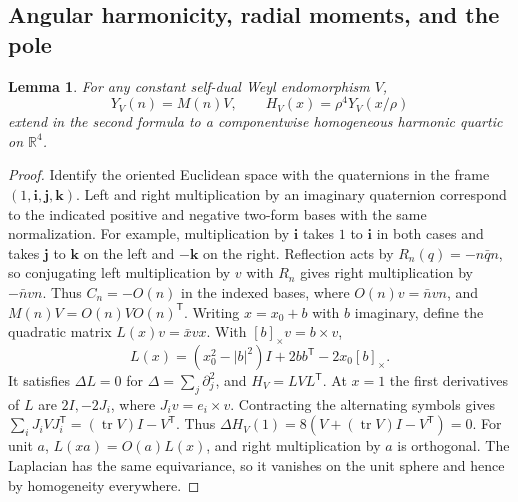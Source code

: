 \documentclass[11pt]{article}
\numberwithin{equation}{section}
\newtheorem{lemma}[theorem]{Lemma}
\theoremstyle{definition}
\theoremstyle{remark}
\begin{document}
\subsection{Angular harmonicity, radial moments, and the pole}

\begin{lemma}\label{xfer:harmonic}
For any constant self-dual Weyl endomorphism \(V\),
\[
 Y_V(n)=M(n)V,\qquad H_V(x)=\rho^4Y_V(x/\rho)
\]
extend in the second formula to a componentwise homogeneous
harmonic quartic on \(\mathbb R^4\).
\end{lemma}

\begin{proof}
Identify the oriented Euclidean space with the quaternions in
the frame \((1,\mathbf i,\mathbf j,\mathbf k)\).
Left and right multiplication by an imaginary quaternion correspond
to the indicated positive and negative two-form bases with the same
normalization. For example, multiplication by \(\mathbf i\) takes
\(1\) to \(\mathbf i\) in both cases and takes \(\mathbf j\)
to \(\mathbf k\) on the left and \(-\mathbf k\) on the right.
Reflection acts by \(R_n(q)=-n\bar qn\), so conjugating
left multiplication by \(v\) with \(R_n\) gives right multiplication
by \(-\bar nvn\). Thus \(C_n=-O(n)\) in the indexed bases, where
\(O(n)v=\bar nvn\), and \(M(n)V=O(n)VO(n)^{\mathsf T}\).
Writing \(x=x_0+b\) with \(b\) imaginary, define the quadratic
matrix \(L(x)v=\bar xvx\). With \([b]_\times v=b\times v\),
\[
 L(x)=(x_0^2-|b|^2)I+2bb^{\mathsf T}-2x_0[b]_\times.
\]
It satisfies \(\Delta L=0\) for \(\Delta=\sum_j\partial_j^2\),
and \(H_V=L V L^{\mathsf T}\).
At \(x=1\) the first derivatives of \(L\) are \(2I,-2J_i\),
where \(J_i v=e_i\times v\). Contracting the alternating symbols
gives \(\sum_i J_i VJ_i^{\mathsf T}=(\operatorname{tr}V)I-V^{\mathsf T}\).
Thus \(\Delta H_V(1)=8(V+(\operatorname{tr}V)I-V^{\mathsf T})=0\).
For unit \(a\), \(L(xa)=O(a)L(x)\), and right multiplication by
\(a\) is orthogonal. The Laplacian has the same equivariance, so
it vanishes on the unit sphere and hence by homogeneity everywhere.
\end{proof}
\end{document}

